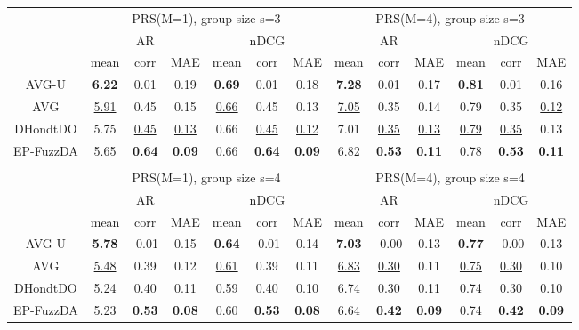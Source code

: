 \begin{tabular}{ c | c c c | c c c || c c c | c c c}

\multicolumn{1}{c}{} & \multicolumn{6}{c}{PRS(M=1), group size s=3} & \multicolumn{6}{c}{PRS(M=4), group size s=3} \\
\multicolumn{1}{c}{} & \multicolumn{3}{c}{AR} & \multicolumn{3}{c}{nDCG} & \multicolumn{3}{c}{AR} & \multicolumn{3}{c}{nDCG} \\
& mean & corr & MAE & mean & corr & MAE & mean & corr & MAE & mean & corr & MAE \\
\hline
AVG-U & \textbf{6.22} & 0.01 & 0.19 & \textbf{0.69} & 0.01 & 0.18 & \textbf{7.28} & 0.01 & 0.17 & \textbf{0.81} & 0.01 & 0.16 \\
AVG & \underline{5.91} & 0.45 & 0.15 & \underline{0.66} & 0.45 & 0.13 & \underline{7.05} & 0.35 & 0.14 & 0.79 & 0.35 & \underline{0.12} \\
DHondtDO & 5.75 & \underline{0.45} & \underline{0.13} & 0.66 & \underline{0.45} & \underline{0.12} & 7.01 & \underline{0.35} & \underline{0.13} & \underline{0.79} & \underline{0.35} & 0.13 \\
EP-FuzzDA & 5.65 & \textbf{0.64} & \textbf{0.09} & 0.66 & \textbf{0.64} & \textbf{0.09} & 6.82 & \textbf{0.53} & \textbf{0.11} & 0.78 & \textbf{0.53} & \textbf{0.11} \\

\multicolumn{12}{c}{} \\
\multicolumn{1}{c}{} & \multicolumn{6}{c}{PRS(M=1), group size s=4} & \multicolumn{6}{c}{PRS(M=4), group size s=4} \\
\multicolumn{1}{c}{} & \multicolumn{3}{c}{AR} & \multicolumn{3}{c}{nDCG} & \multicolumn{3}{c}{AR} & \multicolumn{3}{c}{nDCG} \\
& mean & corr & MAE & mean & corr & MAE & mean & corr & MAE & mean & corr & MAE \\
\hline
AVG-U & \textbf{5.78} & -0.01 & 0.15 & \textbf{0.64} & -0.01 & 0.14 & \textbf{7.03} & -0.00 & 0.13 & \textbf{0.77} & -0.00 & 0.13 \\
AVG & \underline{5.48} & 0.39 & 0.12 & \underline{0.61} & 0.39 & 0.11 & \underline{6.83} & \underline{0.30} & 0.11 & \underline{0.75} & \underline{0.30} & 0.10 \\
DHondtDO & 5.24 & \underline{0.40} & \underline{0.11} & 0.59 & \underline{0.40} & \underline{0.10} & 6.74 & 0.30 & \underline{0.11} & 0.74 & 0.30 & \underline{0.10} \\
EP-FuzzDA & 5.23 & \textbf{0.53} & \textbf{0.08} & 0.60 & \textbf{0.53} & \textbf{0.08} & 6.64 & \textbf{0.42} & \textbf{0.09} & 0.74 & \textbf{0.42} & \textbf{0.09} \\


\end{tabular}

